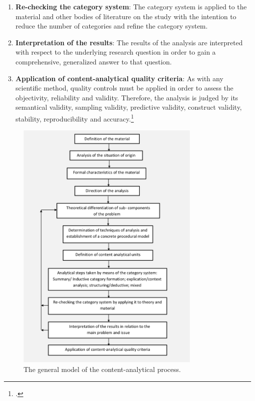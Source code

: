 \begin{enumerate}
    \item \textbf{Re-checking the category system}: The category system is applied to the material and other bodies of literature on the study with the intention to reduce the number of categories and refine the category system. 
    \item \textbf{Interpretation of the results}: The results of the analysis are interpreted with respect to the underlying research question in order to gain a comprehensive, generalized answer to that question.
    \item \textbf{Application of content-analytical quality criteria}: As with any scientific method, quality controls must be applied in order to assess the objectivity, reliability and validity. Therefore, the analysis is judged by its semantical validity, sampling validity, predictive validity, construct validity, stability, reproducibility and accuracy.\footcites[Cf.][p.40 et seqq]{MayringQualitativeContentAnalysis2014}[cf.][p.280]{Flickintroductionqualitativeresearch2009}
\end{enumerate}

\begin{figure}
    \centering
    \includegraphics[width=0.8\textwidth]{graphics/MayringProcess.png}
    \caption[The general model of the content-analytical process.]{The general model of the content-analytical process.\footnotemark}
    \label{fig:MayringProcess}
\end{figure}

